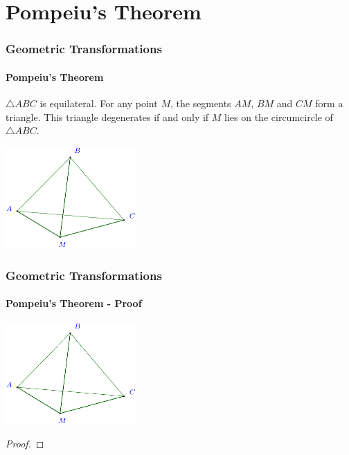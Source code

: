 \documentclass[8pt,xcolor=table,dvipsnames]{beamer}
\begin{document}
\section{Pompeiu's Theorem}

\begin{frame}[t]
    \frametitle{Geometric Transformations}
    \framesubtitle{Pompeiu's Theorem}
    \begin{theorem}
        \label{theorem:pompeiu-theorem}
        $\triangle ABC$ is equilateral.
        For any point $M$, the segments $AM$, $BM$ and $CM$ form a triangle.
        This triangle degenerates if and only if $M$ lies on the circumcircle of $\triangle ABC$.
    \end{theorem}
    
    \bigbreak
    \begin{center}
        \includegraphics[width=5cm]{./svg/pdf/pompeiu-theorem-1.pdf}
    \end{center}
\end{frame}

\begin{frame}[t]
    \frametitle{Geometric Transformations}
    \framesubtitle{Pompeiu's Theorem - Proof}
    \begin{center}
        \includegraphics[width=5cm]{./svg/pdf/pompeiu-theorem-1.pdf}
    \end{center}
    \begin{proof}

    \end{proof}
\end{frame}
\end{document}
